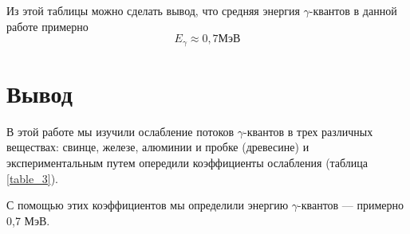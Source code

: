 \documentclass[a4paper,12pt]{extarticle}
\begin{document}
Из этой таблицы можно сделать вывод, что средняя энергия $\gamma$-квантов в данной работе примерно 
\[E_{\gamma} \approx  0,7 \text{МэВ}\]

\section*{Вывод}
В этой работе мы изучили ослабление потоков $\gamma$-квантов в трех различных веществах: свинце, железе, алюминии и пробке (древесине) и экспериментальным путем опередили коэффициенты ослабления (таблица \ref{table_3}). 

С помощью этих коэффициентов мы определили энергию $\gamma$-квантов --- примерно 0,7 МэВ.
\end{document}
